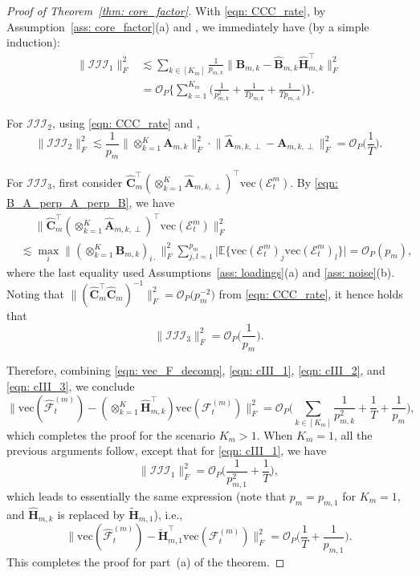 \documentclass[aos]{imsart}
\theoremstyle{plain}
\theoremstyle{definition}
\def\wt#1{\widetilde{#1}}
\def\wh#1{\widehat{#1}}
\def\E{\mathbb{E}}
\def\cE{\mathcal{E}}
\def\cF{\mathcal{F}}
\def\cIII{\mathcal{III}}
\def\cO{\mathcal{O}}
\def\bA{\mathbf{A}}
\def\bB{\mathbf{B}}
\def\bC{\mathbf{C}}
\def\bH{\mathbf{H}}
\def\trans{\intercal}
\def\vec{\mathrm{vec}}
\begin{document}
\begin{proof}[Proof of Theorem~\ref{thm: core_factor}]
With \eqref{eqn: CCC_rate}, by Assumption~\ref{ass: core_factor}(a) and , we immediately have (by a simple induction):
\begin{equation}
\label{eqn: cIII_1}
\begin{split}
    \| \cIII_1\|_F^2 &\lesssim \sum_{k\in[K_m]} \frac{1}{p_{m,k}} \Big\| \bB_{m,k} - \wh{\bB}_{m,k} \wh{\bH}_{m,k}^\trans \Big\|_F^2 \\
    &=
    \cO_P\Bigg\{ \sum_{k=1}^{K_m} \Big( \frac{1}{p_{m,k}^2} + \frac{1}{T p_{m,k}} + \frac{1}{T p_{m,\text{-}k}} \Big) \Bigg\} .
\end{split}
\end{equation}

For $\cIII_2$, using \eqref{eqn: CCC_rate} and ,
\begin{equation}
\label{eqn: cIII_2}
\| \cIII_2\|_F^2 \lesssim \frac{1}{p_m} \big\| \otimes_{k=1}^K \bA_{m,k} \big\|_F^2 \cdot \Big\| \wh{\bA}_{m,k,\perp} -\bA_{m,k,\perp} \Big\|_F^2 
= \cO_P\Big( \frac{1}{T} \Big).
\end{equation}

For $\cIII_3$, first consider $\wh{\bC}_m^\trans (\otimes_{k=1}^K \wh{\bA}_{m,k,\perp})^\trans \vec(\cE_t^{m})$. By \eqref{eqn: B_A_perp_A_perp_B}, we have
\begin{align*}
    &\;\quad
    \Big\| \wh{\bC}_m^\trans (\otimes_{k=1}^K \wh{\bA}_{m,k,\perp})^\trans \vec(\cE_t^{m}) \Big\|_F^2 \\
    &\lesssim \max_i \big\| (\otimes_{k=1}^K \bB_{m,k})_{i\cdot} \big\|_F^2 \sum_{j,l=1}^{p_m} \big| \E\big\{ \vec(\cE_t^{m})_j \vec(\cE_t^{m})_l \big\} \Big|
    = \cO_P(p_m) ,
\end{align*}
where the last equality used Assumptions~\ref{ass: loadings}(a) and \ref{ass: noise}(b). Noting that $\big\| (\wh{\bC}_m^\trans \wh{\bC}_m)^{-1} \big\|_F^2 =\cO_P\big( p_m^{-2} \big)$ from \eqref{eqn: CCC_rate}, it hence holds that
\begin{equation}
\label{eqn: cIII_3}
\| \cIII_3\|_F^2 = \cO_P\Big( \frac{1}{p_m} \Big).
\end{equation}

Therefore, combining \eqref{eqn: vec_F_decomp}, \eqref{eqn: cIII_1}, \eqref{eqn: cIII_2}, and \eqref{eqn: cIII_3}, we conclude
\[
\Big\| \vec(\wh{\cF}_t^{(m)}) - (\otimes_{k=1}^K \wh{\bH}_{m,k}^\trans) \vec(\cF_t^{(m)}) \Big\|_F^2 = \cO_P\Big( \sum_{k\in[K_m]} \frac{1}{p_{m,k}^2} + \frac{1}{T} + \frac{1}{p_m} \Big) ,
\]
which completes the proof for the scenario $K_m> 1$. When $K_m=1$, all the previous arguments follow, except that for \eqref{eqn: cIII_1}, we have
\[
\| \cIII_1\|_F^2 = \cO_P\Big( \frac{1}{p_{m,1}^2} + \frac{1}{T} \Big) ,
\]
which leads to essentially the same expression (note that $p_m=p_{m,1}$ for $K_m=1$, and $\wh{\bH}_{m,k}$ is replaced by $\wt{\bH}_{m,1}$), i.e.,
\[
\Big\| \vec(\wh{\cF}_t^{(m)}) - \wt{\bH}_{m,1}^\trans \vec(\cF_t^{(m)}) \Big\|_F^2 = \cO_P\Big( \frac{1}{T} + \frac{1}{p_{m,1}} \Big) .
\]
This completes the proof for part~(a) of the theorem.




\end{proof}
\end{document}
